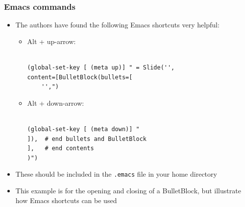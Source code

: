 \documentclass{beamer}
\begin{document}
\begin{frame}[fragile]
\frametitle{Emacs commands}

\begin{block}

\begin{itemize}
\item The authors have found the following Emacs shortcuts very helpful:
\begin{itemize}
\item Alt + up-arrow:\begin{Verbatim}[fontsize=\footnotesize,tabsize=4,baselinestretch=0.85,fontfamily=tt,xleftmargin=7mm]

(global-set-key [ (meta up)] " = Slide('',
content=[BulletBlock(bullets=[
    '',")
\end{Verbatim}

\end{itemize}
\begin{itemize}
\item Alt + down-arrow:\begin{Verbatim}[fontsize=\footnotesize,tabsize=4,baselinestretch=0.85,fontfamily=tt,xleftmargin=7mm]

(global-set-key [ (meta down)] "
]),  # end bullets and BulletBlock
],   # end contents
)")
\end{Verbatim}

\end{itemize}
\item These should be included in the \texttt{.emacs} file in your home directory
\item This example is for the opening and closing of a BulletBlock, but illustrate how Emacs shortcuts can be used
\end{itemize}

\end{block}

\end{frame}
\end{document}
